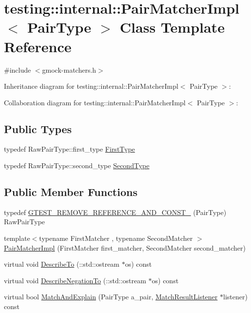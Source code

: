 \hypertarget{classtesting_1_1internal_1_1_pair_matcher_impl}{}\section{testing\+:\+:internal\+:\+:Pair\+Matcher\+Impl$<$ Pair\+Type $>$ Class Template Reference}
\label{classtesting_1_1internal_1_1_pair_matcher_impl}


{\ttfamily \#include $<$gmock-\/matchers.\+h$>$}



Inheritance diagram for testing\+:\+:internal\+:\+:Pair\+Matcher\+Impl$<$ Pair\+Type $>$\+:


Collaboration diagram for testing\+:\+:internal\+:\+:Pair\+Matcher\+Impl$<$ Pair\+Type $>$\+:
\subsection*{Public Types}
\begin{DoxyCompactItemize}
\item 
typedef Raw\+Pair\+Type\+::first\+\_\+type \hyperlink{classtesting_1_1internal_1_1_pair_matcher_impl_a9de66d76f0ebb0f107a9c18903b03176}{First\+Type}
\item 
typedef Raw\+Pair\+Type\+::second\+\_\+type \hyperlink{classtesting_1_1internal_1_1_pair_matcher_impl_ad63c9ff4f1aff81562efca293ff5aca9}{Second\+Type}
\end{DoxyCompactItemize}
\subsection*{Public Member Functions}
\begin{DoxyCompactItemize}
\item 
typedef \hyperlink{classtesting_1_1internal_1_1_pair_matcher_impl_aa035224a7b73b2af1d1d27226a479241}{G\+T\+E\+S\+T\+\_\+\+R\+E\+M\+O\+V\+E\+\_\+\+R\+E\+F\+E\+R\+E\+N\+C\+E\+\_\+\+A\+N\+D\+\_\+\+C\+O\+N\+S\+T\+\_\+} (Pair\+Type) Raw\+Pair\+Type
\item 
{\footnotesize template$<$typename First\+Matcher , typename Second\+Matcher $>$ }\\\hyperlink{classtesting_1_1internal_1_1_pair_matcher_impl_ae2615e785df46255c8695a5972ca510a}{Pair\+Matcher\+Impl} (First\+Matcher first\+\_\+matcher, Second\+Matcher second\+\_\+matcher)
\item 
virtual void \hyperlink{classtesting_1_1internal_1_1_pair_matcher_impl_a901ef35fe2284f9c0decf41af8143dd2}{Describe\+To} (\+::std\+::ostream $\ast$os) const 
\item 
virtual void \hyperlink{classtesting_1_1internal_1_1_pair_matcher_impl_a922aa4076ef4e2f1a2d2b4ae30d8be7c}{Describe\+Negation\+To} (\+::std\+::ostream $\ast$os) const 
\item 
virtual bool \hyperlink{classtesting_1_1internal_1_1_pair_matcher_impl_a691add64a7dd061451722cdf95a6eba2}{Match\+And\+Explain} (Pair\+Type a\+\_\+pair, \hyperlink{classtesting_1_1_match_result_listener}{Match\+Result\+Listener} $\ast$listener) const 
\end{DoxyCompactItemize}


